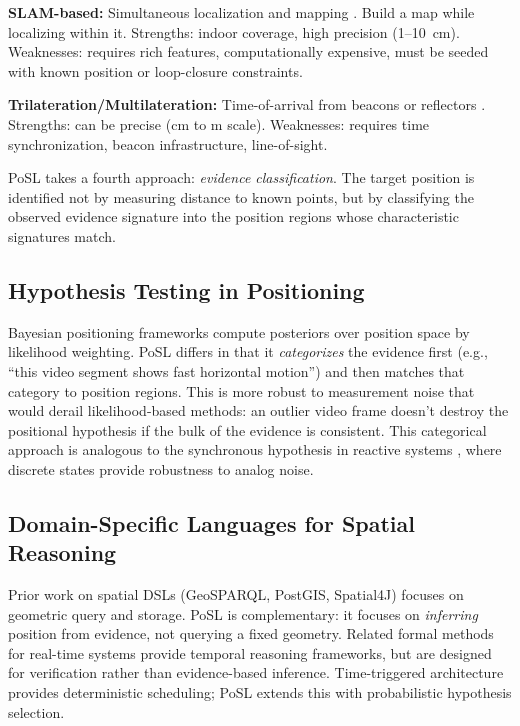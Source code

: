\documentclass[twocolumn,10pt]{article}
\begin{document}
\textbf{SLAM-based:} Simultaneous localization and mapping \cite{thrun2004fastslam,kaess2012isam2}.
Build a map while localizing within it. Strengths: indoor coverage, high precision
(1--10~cm). Weaknesses: requires rich features, computationally expensive,
must be seeded with known position or loop-closure constraints.

\textbf{Trilateration/Multilateration:} Time-of-arrival from beacons or
reflectors \cite{guanella2005robust}. Strengths: can be precise (cm to m scale).
Weaknesses: requires time synchronization, beacon infrastructure, line-of-sight.

PoSL takes a fourth approach: \emph{evidence classification}. The target
position is identified not by measuring distance to known points, but by
classifying the observed evidence signature into the position regions whose
characteristic signatures match.

\subsection{Hypothesis Testing in Positioning}

Bayesian positioning frameworks \cite{thrun2005probabilistic,bishop2006pattern} compute posteriors
over position space by likelihood weighting. PoSL differs in that it
\emph{categorizes} the evidence first (e.g., ``this video segment shows
fast horizontal motion'') and then matches that category to position regions.
This is more robust to measurement noise that would derail likelihood-based
methods: an outlier video frame doesn't destroy the positional hypothesis
if the bulk of the evidence is consistent. This categorical approach is
analogous to the synchronous hypothesis in reactive systems \cite{berry1992esterel,halbwachs1991lustre},
where discrete states provide robustness to analog noise.

\subsection{Domain-Specific Languages for Spatial Reasoning}

Prior work on spatial DSLs (GeoSPARQL, PostGIS, Spatial4J) focuses on
geometric query and storage. PoSL is complementary: it focuses on
\emph{inferring} position from evidence, not querying a fixed geometry.
Related formal methods for real-time systems \cite{alur1994timed,henzinger1996hybrid,pnueli1977temporal}
provide temporal reasoning frameworks, but are designed for verification rather than
evidence-based inference. Time-triggered architecture \cite{kopetz2003tta,kopetz2011rts} provides
deterministic scheduling; PoSL extends this with probabilistic hypothesis selection.
\end{document}
